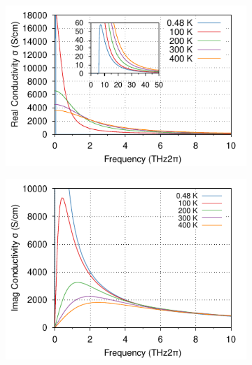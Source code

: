 \begin{figure}[!tbp]
    \centering
  \begin{subfigure}[b]{0.49\textwidth}
    \centering
    \includegraphics[width=\textwidth]{figures/rubrene-frohlich-real-conductivity-temp-0.4to400K-freq-0to10omega-COLOUR.pdf}
  \end{subfigure}
  \hfill
  \begin{subfigure}[b]{0.49\textwidth}
    \centering
    \includegraphics[width=\textwidth]{figures/rubrene-frohlich-imag-conductivity-temp-0.4to400K-freq-0to10omega-COLOUR.pdf}
  \end{subfigure}
  \begin{subfigure}[b]{0.49\textwidth}
    \centering

\end{subfigure}
\end{figure}
